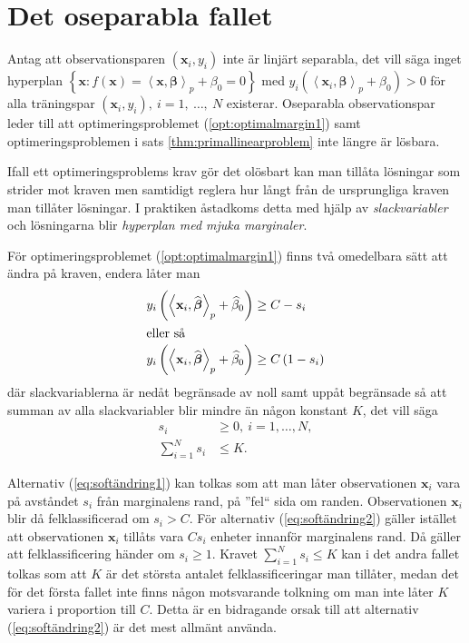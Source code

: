 \documentclass[a4paper, 12pt]{report}
\theoremstyle{definition}
\theoremstyle{remark}
\newcommand{\bfbeta}{{\boldsymbol{\beta}}}
\newcommand{\bfx}{\mathbf{x}}
\newcommand{\llangle}{\left\langle}
\newcommand{\rrangle}{\right\rangle}
\newcommand{\inner}[2]{\llangle #1, #2 \rrangle}
\begin{document}
\section{Det oseparabla fallet}
Antag att observationsparen $\left(\mathbf{x}_i, y_i\right)$ inte är linjärt separabla, det vill säga inget hyperplan $\left\{\mathbf{x} : f\left(\mathbf{x}\right) = \inner{\bfx}{\bfbeta}_p + \beta_0 = 0 \right\}$ med $y_i\left(\inner{\bfx_i}{\bfbeta}_p+\beta_0\right)>0$ för alla träningspar $\left(\mathbf{x}_i,y_i\right),~i=1,~\dots,~N$ existerar. Oseparabla observationspar leder till att optimeringsproblemet (\ref{opt:optimalmargin1}) samt optimeringsproblemen i sats \ref{thm:primallinearproblem} inte längre är lösbara.

Ifall ett optimeringsproblems krav gör det olösbart kan man tillåta lösningar som strider mot kraven men samtidigt reglera hur långt från de ursprungliga kraven man tillåter lösningar. I praktiken åstadkoms detta med hjälp av \emph{slackvariabler} och lösningarna blir \emph{hyperplan med mjuka marginaler}.

För optimeringsproblemet (\ref{opt:optimalmargin1}) finns två omedelbara sätt att ändra på kraven, endera låter man
\begin{align}
	y_i\left(\inner{\bfx_i}{\widehat{\bfbeta}}_p+\widehat{\beta}_0\right) &\geq C-s_i\label{eq:softändring1}\\
	\intertext{eller så}
	y_i\left(\inner{\bfx_i}{\widehat{\bfbeta}}_p+\widehat{\beta}_0\right) &\geq C\left(1-s_i\right)\label{eq:softändring2}
\end{align}
där slackvariablerna är nedåt begränsade av noll samt uppåt begränsade så att summan av alla slackvariabler blir mindre än någon konstant $K$, det vill säga \begin{equation*}
\begin{aligned}
s_i&\geq0,~i=1,\dots,N,\\
\sum_{i=1}^{N}s_i&\leq K.
\end{aligned}
\end{equation*}

Alternativ (\ref{eq:softändring1}) kan tolkas som att man låter observationen $\mathbf{x}_i$ vara på avståndet $s_i$ från marginalens rand, på ''fel`` sida om randen. Observationen $\mathbf{x}_i$ blir då felklassificerad om $s_i>C$. För alternativ (\ref{eq:softändring2}) gäller istället att observationen $\mathbf{x}_i$ tillåts vara $Cs_i$ enheter innanför marginalens rand. Då gäller att felklassificering händer om $s_i\geq1$. Kravet $\sum_{i=1}^{N} s_i \leq K$ kan i det andra fallet tolkas som att $K$ är det största antalet felklassificeringar man tillåter, medan det för det första fallet inte finns någon motsvarande tolkning om man inte låter $K$ variera i proportion till $C$. Detta är en bidragande orsak till att alternativ (\ref{eq:softändring2}) är det mest allmänt använda.
\end{document}
